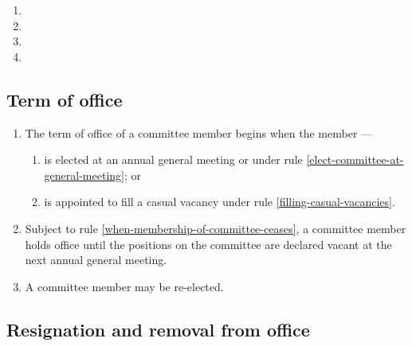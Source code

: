 \documentclass[../constitution.tex]{subfiles}
\begin{document}
\begin{enumerate}
\item {}

\item {}

\item {}

\item {}

\end{enumerate}

\hypertarget{term-of-office}{%
\subsection{Term of office}\label{term-of-office}}

\begin{enumerate}

\item The term of office of a committee member begins when the member ---

  \begin{enumerate}
  
  \item is elected at an annual general meeting or under rule \ref{elect-committee-at-general-meeting}; or
  \item is appointed to fill a casual vacancy under rule \ref{filling-casual-vacancies}.
  \end{enumerate}
\item Subject to rule \ref{when-membership-of-committee-ceases}, a committee member holds office until the positions on the committee are declared vacant at the next annual general meeting.
\item A committee member may be re-elected.
\end{enumerate}

\hypertarget{resignation-and-removal-from-office}{%
\subsection{Resignation and removal from office}\label{resignation-and-removal-from-office}}
\end{document}
